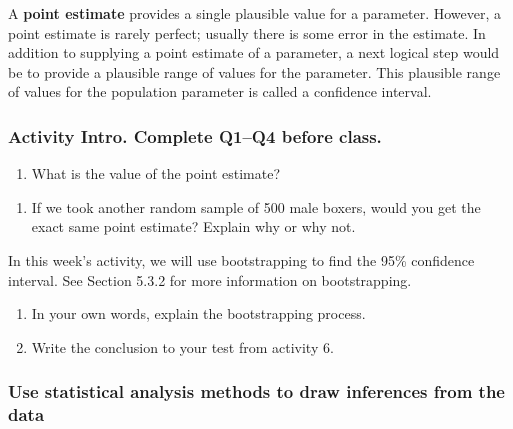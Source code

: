 \documentclass[
]{report}
\providecommand{\tightlist}{%
  \setlength{\itemsep}{0pt}\setlength{\parskip}{0pt}}
\begin{document}
A \textbf{point estimate} provides a single plausible value for a parameter. However, a point estimate is rarely perfect; usually there is some error in the estimate. In addition to supplying a point estimate of a parameter, a next logical step would be to provide a plausible range of values for the parameter. This plausible range of values for the population parameter is called a confidence interval.

\hypertarget{activity-intro.-complete-q1q4-before-class.}{%
\subsubsection*{Activity Intro. Complete Q1--Q4 before class.}\label{activity-intro.-complete-q1q4-before-class.}}

\begin{enumerate}
\def\labelenumi{\arabic{enumi}.}
\tightlist
\item
  What is the value of the point estimate?
\end{enumerate}

\vspace{0.5in}

\begin{enumerate}
\def\labelenumi{\arabic{enumi}.}
\setcounter{enumi}{1}
\tightlist
\item
  If we took another random sample of 500 male boxers, would you get the exact same point estimate? Explain why or why not.
\end{enumerate}

\vspace{0.5in}

In this week's activity, we will use bootstrapping to find the 95\% confidence interval. See Section 5.3.2 for more information on bootstrapping.

\begin{enumerate}
\def\labelenumi{\arabic{enumi}.}
\setcounter{enumi}{2}
\item
  In your own words, explain the bootstrapping process.
  \vspace{0.5in}
\item
  Write the conclusion to your test from activity 6.
\end{enumerate}

\vspace{0.5in}

\hypertarget{use-statistical-analysis-methods-to-draw-inferences-from-the-data-1}{%
\subsubsection*{Use statistical analysis methods to draw inferences from the data}\label{use-statistical-analysis-methods-to-draw-inferences-from-the-data-1}}
\end{document}
